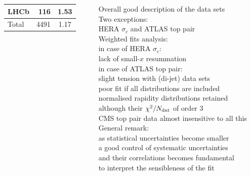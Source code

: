 \documentclass{beamer}
\begin{document}
\begin{frame}
\begin{columns}[c]
\begin{column}{0.5\textwidth}
\begin{tabularx}{\columnwidth}{Xrc}
   LHCb                       &  116 & 1.53 \\
   \midrule
   Total                      & 4491 & 1.17 \\
   \bottomrule 
   \end{tabularx}
  \end{column}
  \begin{column}{0.5\textwidth}
   \centering
   \footnotesize
   Overall good description of the data sets\\
   \vspace{0.2cm}
   Two exceptions:\\
   HERA $\sigma_c$ and ATLAS top pair\\
   \vspace{0.2cm}
   Weighted fits analysis:\\
   {\scriptsize in case of HERA $\sigma_c$:}\\
   {\scriptsize lack of small-$x$ resummation}\\
   \vspace{0.2cm}
   {\scriptsize in case of ATLAS top pair:\\ slight tension with (di-jet) data sets}\\
   {\scriptsize poor fit if all distributions are included}\\
   {\scriptsize normalised rapidity distributions retained}\\
   {\scriptsize although their $\chi^2/N_{\rm dat}$ of order 3}\\
   {\scriptsize CMS top pair data almost insensitive to all this}\\
   \vspace{0.2cm}
   General remark:\\
   {\scriptsize as statistical uncertainties become smaller}\\
   {\scriptsize a good control of systematic uncertainties}\\ 
   {\scriptsize and their correlations becomes fundamental}\\ 
   {\scriptsize to interpret the sensibleness of the fit}\\
  \end{column}
 \end{columns}
\end{frame}
\end{document}
